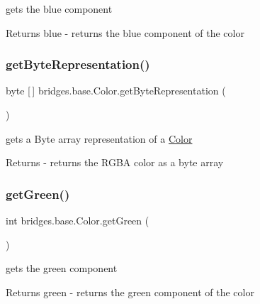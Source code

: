 gets the blue component

\begin{DoxyReturn}{Returns}
blue -\/ returns the blue component of the color 
\end{DoxyReturn}
\mbox{\label{classbridges_1_1base_1_1_color_a07215c888a6d17374a3d862ff30d5f93}} 
\subsubsection{\texorpdfstring{get\+Byte\+Representation()}{getByteRepresentation()}}
{\footnotesize\ttfamily byte \mbox{[}$\,$\mbox{]} bridges.\+base.\+Color.\+get\+Byte\+Representation (\begin{DoxyParamCaption}{ }\end{DoxyParamCaption})}

gets a Byte array representation of a \mbox{\hyperlink{classbridges_1_1base_1_1_color}{Color}}

\begin{DoxyReturn}{Returns}
-\/ returns the R\+G\+BA color as a byte array 
\end{DoxyReturn}
\mbox{\label{classbridges_1_1base_1_1_color_a8f3fdd23cf785704faa2e3701e25978f}} 
\subsubsection{\texorpdfstring{get\+Green()}{getGreen()}}
{\footnotesize\ttfamily int bridges.\+base.\+Color.\+get\+Green (\begin{DoxyParamCaption}{ }\end{DoxyParamCaption})}

gets the green component

\begin{DoxyReturn}{Returns}
green -\/ returns the green component of the color 
\end{DoxyReturn}
\mbox{\label{classbridges_1_1base_1_1_color_aced9bc89248b85686ba5385472974fe6}} 

